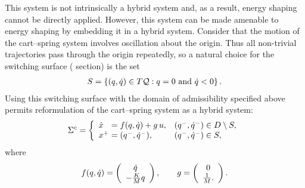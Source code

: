 This system is not intrinsically a hybrid system and, as a result, energy
shaping cannot be directly applied.
% 
However, this system can be made amenable to energy shaping by embedding it
in a hybrid system.
% 
Consider that the motion of the cart--spring system involves oscillation about
the origin.
% 
Thus all non-trivial trajectories pass through the origin repeatedly, so a
natural choice for the switching surface (\Poincare{} section) is the set
\begin{align}
  S = \left\{ (q, \dot{q}) \in T\mathcal{Q} : q = 0 \mbox{ and } \dot{q} < 0 \right\}.
  \label{eq:cart_spring_guard}
\end{align}
% 
Using this switching surface with the domain of admissibility specified above
permits reformulation of the cart--spring system as a hybrid system:
% 
\begin{align}
  \Sigma^{c} = \left\{
    \begin{array}{l l}
      {\dot {x}}\hphantom{^+} = f(q, \dot{q}) + g \, u, & (q^{-}, \dot{q}^{-}) \in D \setminus
      S,\\
      x^{+} = (q^{-}, \dot{q}^{-}), & (q^{-}, \dot{q}^{-}) \in S,
    \end{array}\right.
\end{align}
where
\begin{align*}
  f(q, \dot{q}) = \left(\begin{array}{c}
      \dot{q}\\
      -\frac{K}{M} q
    \end{array}\right), \qquad
  g = \left(\begin{array}{c}
      0\\
      \frac{1}{M}.
    \end{array}\right).
\end{align*}

